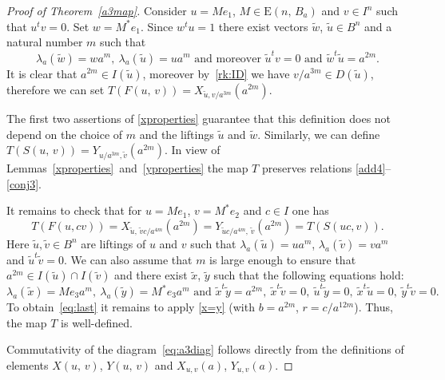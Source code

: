 \documentclass[11pt]{amsart}
\theoremstyle{plain} \declaretheorem[name=Theorem, Refname={Theorem,Theorems}]{tm} \Crefname{tm}{Theorem}{Theorems}
\numberwithin{equation}{section}
\theoremstyle{definition} \newtheorem{df}[lm]{Definition} \Crefname{df}{Definition}{Definitions}
\theoremstyle{remark} \newtheorem{rk}[lm]{Remark} \Crefname{rk}{Remark}{Remarks}
\newcommand{\E}{{\mathrm{E}}}
\begin{document}
\begin{proof}[Proof of Theorem~\ref{a3map}]
Consider $u=Me_1$, $M\in\E(n,\,B_a)$ and $v\in I^n$ such that $u^tv=0$.
Set $w=M^*e_1$. Since $w^tu=1$ there exist vectors $\tilde w$, $\tilde u\in B^n$ and a natural number $m$ such that 
$$ \lambda_a(\tilde{w})=wa^m,\ \lambda_a(\tilde{u})=ua^m\text{ and moreover }\tilde u^tv=0\text{ and }\tilde w^t\tilde u=a^{2m}.$$
It is clear that $a^{2m}\in I(\tilde u)$, moreover by~\cref{rk:ID} we have $v/a^{3m} \in D(\tilde u)$, therefore we can set $T(F(u,\,v))=X_{\tilde u,v/a^{3m}}(a^{2m})$. 

The first two assertions of \cref{xproperties} guarantee that this definition does not depend on the choice of $m$ and the liftings $\tilde u$ and $\tilde w$.
Similarly, we can define $T(S(u,\,v))=Y_{u/a^{3m},\tilde v}(a^{2m})$.
In view of Lemmas~\ref{xproperties}~and~\ref{yproperties} the map $T$ preserves relations \eqref{add4}--\eqref{conj3}.

It remains to check that for $u = Me_1$, $v=M^*e_2$ and $c\in I$ one has
\begin{equation}T(F(u, cv)) = X_{\tilde u,\,\tilde v c/a^{4m}}(a^{2m}) = Y_{\tilde uc/a^{4m},\, \tilde v}(a^{2m}) = T(S(uc, v)). \label{eq:last}\end{equation}
Here $\tilde u, \tilde v \in B^n$ are liftings of $u$ and $v$ such that $\lambda_a(\tilde u)= ua^m$, $\lambda_a(\tilde v)= va^m$ and $\tilde u^t \tilde v = 0$.
We can also assume that $m$ is large enough to ensure that $a^{2m}\in I(\tilde{u})\cap I(\tilde{v})$ and there exist $\tilde{x}$, $\tilde{y}$ such that the following equations hold:
$$\lambda_a(\tilde{x})=Me_3a^m,\ \lambda_a(\tilde{y})=M^*e_3a^m\text{ and }\tilde{x}^t\tilde{y}=a^{2m},\ \tilde{x}^t\tilde{v} = 0,\ \tilde{u}^t\tilde{y} =0,\ \tilde{x}^t\tilde{u} = 0,\ \tilde{y}^t\tilde{v}=0.$$
To obtain~\eqref{eq:last} it remains to apply \cref{x=y} (with $b=a^{2m}$, $r=c/a^{12m}$).
Thus, the map $T$ is well-defined.

Commutativity of the diagram~\eqref{eq:a3diag} follows directly from the definitions of elements $X(u,\,v)$, $Y(u,\,v)$ and $X_{u,v}(a)$, $Y_{u,v}(a)$. \end{proof}

\printbibliography
\end{document}
